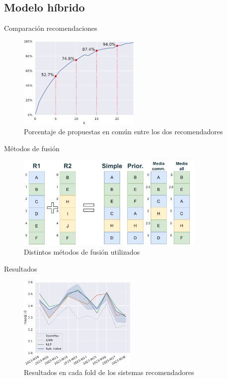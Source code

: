 \subsection{Modelo híbrido}
\begin{frame}{Comparación recomendaciones}
    \begin{figure}
        \centering
        \includegraphics[height=45mm]{./images/graphs/12_hybrid_common_Decentraland_W-THU_normalize=True.pdf}
        \caption{Porcentaje de propuestas en común entre los dos recomendadores}
    \end{figure}
\end{frame}    

\begin{frame}{Métodos de fusión}
    \begin{figure}
        \centering
        \includegraphics[height=45mm]{./images/diagrams/metodos-fusion.drawio.pdf}
        \caption{Distintos métodos de fusión utilizados}
    \end{figure}
\end{frame}

\begin{frame}{Resultados}
    \begin{figure}
        \centering
        \includegraphics[height=45mm]{./images/graphs/12_hybrid_merge_results_folds_Decentraland_W-THU_normalize=True_compare.pdf}
        \caption{Resultados en cada fold de los sistemas recomendadores}
    \end{figure}
\end{frame}